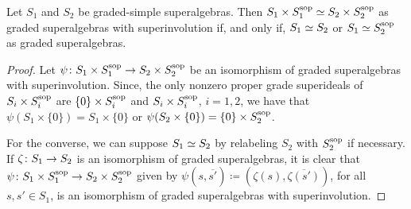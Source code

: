 



\begin{lemma}\label{cor:iso-SxSsop}
    Let $S_1$ and $S_2$ be graded-simple superalgebras. 
    Then $S_1\times S_1^{\mathrm{sop}} \simeq S_2\times S_2^{\mathrm{sop}}$ as graded superalgebras with superinvolution if, and only if, $S_1 \simeq S_2$ or $S_1 \simeq S_2^{\mathrm{sop}}$ as graded superalgebras.
\end{lemma}

\begin{proof}
    Let $\psi\colon S_1\times S_1^{\mathrm{sop}} \to S_2\times S_2^{\mathrm{sop}}$ be an isomorphism of graded superalgebras with superinvolution. 
    Since, the only nonzero proper grade superideals of $S_i \times S_i^{\mathrm{sop}}$ are $\{ 0 \} \times S_i^{\mathrm{sop}}$ and $S_i\times S_i^{\mathrm{sop}}$, $i = 1,2$, we have that $\psi(S_1\times \{ 0 \}) = S_1\times \{ 0 \}$ or $\psi(S_2\times \{ 0 \}) = \{ 0 \} \times S_2^{\mathrm{sop}}$.  
    
    For the converse, we can suppose $S_1 \simeq S_2$ by relabeling $S_2$ with $S_2^{\mathrm{sop}}$ if necessary.
    If $\zeta \colon S_1 \to S_2$ is an isomorphism of graded superalgebras, it is clear that $\psi\colon S_1\times S_1^{\mathrm{sop}} \to S_2\times S_2^{\mathrm{sop}}$ given by $\psi (s, \overline{s'}) \coloneqq (\zeta(s), \overline{\zeta(s')})$, for all $s,s' \in S_1$, is an isomorphism of graded superalgebras with superinvolution.
\end{proof}

